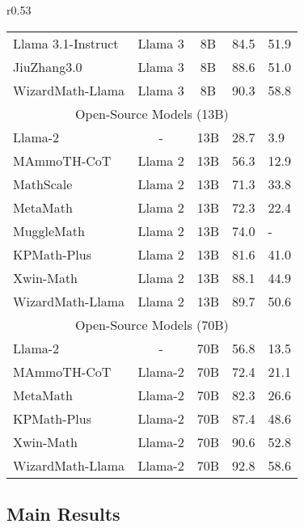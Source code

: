 \begin{wraptable}{r}{0.53\textwidth}
{\begin{tabular}{lccll}
    Llama 3.1-Instruct~\citep{dubey2024-llama3} & Llama 3 & 8B & 84.5 & 51.9 \\ 
    JiuZhang3.0~\citep{zhou2024jiuzhang3} & Llama 3 & 8B & 88.6 & 51.0 \\  
    \rowcolor{gray!30}
    WizardMath-Llama & Llama 3 & 8B & 90.3 & 58.8 \\  
    \midrule
    \multicolumn{5}{c}{Open-Source Models (13B)}\\
    \midrule  
    Llama-2~\citep{touvron2023llama2} & - & 13B & 28.7 & 3.9 \\  
    MAmmoTH-CoT~\citep{yue2023mammoth} & Llama 2 & 13B & 56.3 & 12.9 \\  
    MathScale~\citep{tang2024mathscale} & Llama 2 & 13B & 71.3 & 33.8 \\  
    MetaMath~\citep{yu2023metamath} & Llama 2 & 13B & 72.3 & 22.4 \\  
    MuggleMath~\citep{Li2023mugglemath} & Llama 2 & 13B & 74.0 & - \\  
    KPMath-Plus~\citep{huang2024-KPMath} & Llama 2 & 13B & 81.6 & 41.0 \\  
    Xwin-Math~\citep{li2024-Xwin-math} & Llama 2 & 13B & 88.1 & 44.9 \\  
    \rowcolor{gray!30}
    WizardMath-Llama & Llama 2 & 13B & 89.7 & 50.6 \\  
    \midrule
    \multicolumn{5}{c}{Open-Source Models (70B)}\\
    \midrule 
    Llama-2~\citep{touvron2023llama2} & - & 70B & 56.8 & 13.5 \\  
    MAmmoTH-CoT~\citep{yue2023mammoth} & Llama-2 & 70B & 72.4 & 21.1 \\  
    MetaMath~\citep{yu2023metamath} & Llama-2 & 70B & 82.3 & 26.6 \\  
    KPMath-Plus~\citep{huang2024-KPMath} & Llama-2 & 70B & 87.4 & 48.6 \\  
    Xwin-Math~\citep{li2024-Xwin-math} & Llama-2 & 70B & 90.6 & 52.8 \\  
    \rowcolor{gray!30}
    WizardMath-Llama & Llama-2 & 70B & 92.8 & 58.6 \\ 
    \bottomrule
    \end{tabular}
    }

    \label{tab:gsm8k_math_merge}
    \vspace{-2cm}
\end{wraptable}

\subsection{Main Results}

